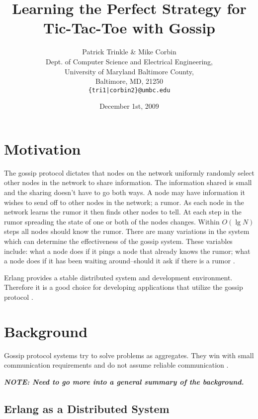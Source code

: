 \documentclass[11pt,twocolumn]{article}
\title{Learning the Perfect Strategy for Tic-Tac-Toe with Gossip}
\author{Patrick Trinkle \& Mike Corbin\\
Dept. of Computer Science and Electrical Engineering,\\
University of Maryland Baltimore County,\\
Baltimore, MD, 21250\\
\texttt{\{tri1|corbin2\}@umbc.edu}}
\date{December 1st, 2009}
\begin{document}

\section{Motivation}

The gossip protocol dictates that nodes on the network uniformly randomly select other nodes in the network to share information.  The information shared is small and the sharing doesn't have to go both ways.  A node may have information it wishes to send off to other nodes in the network; a rumor.  As each node in the network learns the rumor it then finds other nodes to tell.  At each step in the rumor spreading the state of one or both of the nodes changes.  Within $O(\lg N)$ steps all nodes should know the rumor.  There are many variations in the system which can determine the effectiveness of the gossip system.  These variables include: what a node does if it pings a node that already knows the rumor; what a node does if it has been waiting around--should it ask if there is a rumor \cite{Birm2007}.

Erlang provides a stable distributed system and development environment.  Therefore it is a good choice for developing applications that utilize the gossip protocol \cite{Erlang}.

\section{Background}

Gossip protocol systems try to solve problems as aggregates.  They win with small communication requirements and do not assume reliable communication \cite{Birm2007}.

{\bf {\em NOTE: Need to go more into a general summary of the background.}}

\subsection{Erlang as a Distributed System}
\end{document}
